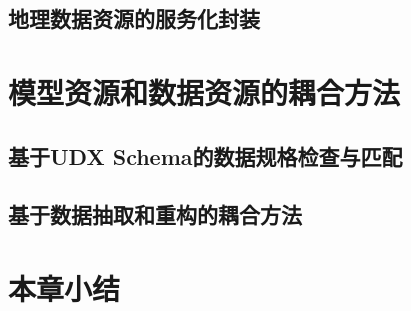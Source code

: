 \subsection{地理数据资源的服务化封装}

\section{模型资源和数据资源的耦合方法}
\subsection{基于UDX Schema的数据规格检查与匹配}
\subsection{基于数据抽取和重构的耦合方法}

\section{本章小结}
